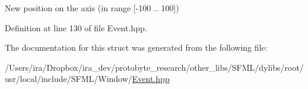New position on the axis (in range \mbox{[}-\/100 .. 100\mbox{]}) 



Definition at line 130 of file Event.\-hpp.



The documentation for this struct was generated from the following file\-:\begin{DoxyCompactItemize}
\item 
/\-Users/ira/\-Dropbox/ira\-\_\-dev/protobyte\-\_\-research/other\-\_\-libs/\-S\-F\-M\-L/dylibs/root/usr/local/include/\-S\-F\-M\-L/\-Window/\hyperlink{_event_8hpp}{Event.\-hpp}\end{DoxyCompactItemize}

